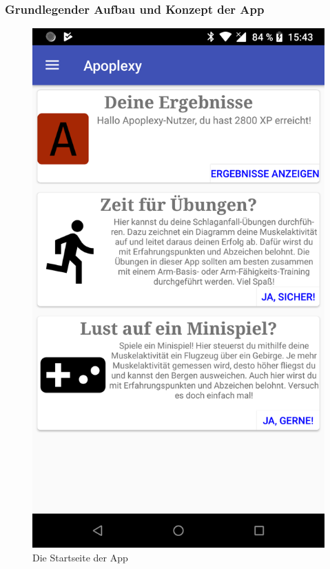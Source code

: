 \newpage
\setcounter{subsection}{5}
\setcounter{subsubsection}{0}
\tocless\subsubsection{Grundlegender Aufbau und Konzept der App}
\begin{multicols}{2}
\begin{figure}[H]
	\centering
	\includegraphics[scale=0.1]{pics/device-home.png}
	\caption{Die Startseite der App}

\end{figure}
\end{multicols}
